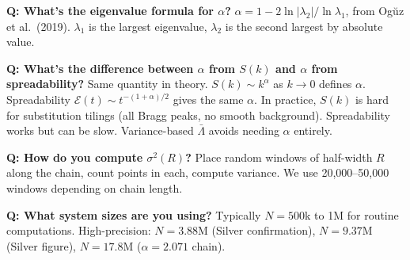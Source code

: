 \documentclass[11pt]{article}
\newcommand{\Q}[1]{\textcolor{qcolor}{\textbf{Q: #1}}}
\begin{document}
\Q{What's the eigenvalue formula for $\alpha$?}
$\alpha = 1 - 2\ln|\lambda_2|/\ln\lambda_1$, from Og\u{u}z et al.\ (2019). $\lambda_1$ is the largest eigenvalue, $\lambda_2$ is the second largest by absolute value.

\Q{What's the difference between $\alpha$ from $S(k)$ and $\alpha$ from spreadability?}
Same quantity in theory. $S(k) \sim k^\alpha$ as $k\to 0$ defines $\alpha$. Spreadability $\mathcal{E}(t) \sim t^{-(1+\alpha)/2}$ gives the same $\alpha$. In practice, $S(k)$ is hard for substitution tilings (all Bragg peaks, no smooth background). Spreadability works but can be slow. Variance-based $\bar\Lambda$ avoids needing $\alpha$ entirely.

\Q{How do you compute $\sigma^2(R)$?}
Place random windows of half-width $R$ along the chain, count points in each, compute variance. We use 20,000--50,000 windows depending on chain length.

\Q{What system sizes are you using?}
Typically $N = 500$k to 1M for routine computations. High-precision: $N = 3.88$M (Silver confirmation), $N = 9.37$M (Silver figure), $N = 17.8$M ($\alpha=2.071$ chain).
\end{document}
